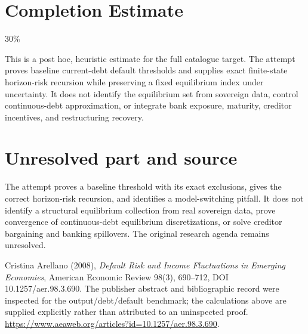 \documentclass[11pt]{article}
\begin{document}
\section{Completion Estimate}
30\%

This is a post hoc, heuristic estimate for the full catalogue target.
The attempt proves baseline current-debt default thresholds and supplies exact finite-state horizon-risk recursion while preserving a fixed equilibrium index under uncertainty. It does not identify the equilibrium set from sovereign data, control continuous-debt approximation, or integrate bank exposure, maturity, creditor incentives, and restructuring recovery.

\section*{Unresolved part and source}
The attempt proves a baseline threshold with its exact exclusions, gives the correct horizon-risk recursion, and identifies a model-switching pitfall. It does not identify a structural equilibrium collection from real sovereign data, prove convergence of continuous-debt equilibrium discretizations, or solve creditor bargaining and banking spillovers. The original research agenda remains unresolved.

Cristina Arellano (2008), \emph{Default Risk and Income Fluctuations in Emerging Economies}, American Economic Review 98(3), 690--712, DOI 10.1257/aer.98.3.690. The publisher abstract and bibliographic record were inspected for the output/debt/default benchmark; the calculations above are supplied explicitly rather than attributed to an uninspected proof. \url{https://www.aeaweb.org/articles?id=10.1257/aer.98.3.690}.
\end{document}
